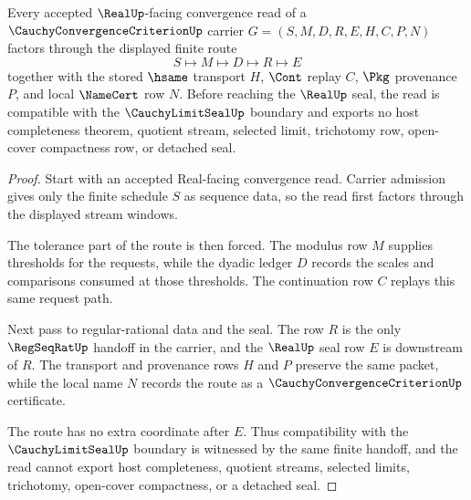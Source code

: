 \begin{theorem}
\label{thm:cauchy-convergence-criterion-real-seal-handoff}
Every accepted $\RealUp$-facing convergence read of a $\CauchyConvergenceCriterionUp$ carrier $G=(S,M,D,R,E,H,C,P,N)$ factors through the displayed finite route
$$
S \longmapsto M \longmapsto D \longmapsto R \longmapsto E
$$
together with the stored $\hsame$ transport $H$, $\Cont$ replay $C$, $\Pkg$ provenance $P$, and local $\NameCert$ row $N$. Before reaching the $\RealUp$ seal, the read is compatible with the $\CauchyLimitSealUp$ boundary and exports no host completeness theorem, quotient stream, selected limit, trichotomy row, open-cover compactness row, or detached seal.
\end{theorem}
\begin{proof}
Start with an accepted Real-facing convergence read. Carrier admission gives only the finite schedule $S$ as sequence data, so the read first factors through the displayed stream windows.

The tolerance part of the route is then forced. The modulus row $M$ supplies thresholds for the requests, while the dyadic ledger $D$ records the scales and comparisons consumed at those thresholds. The continuation row $C$ replays this same request path.

Next pass to regular-rational data and the seal. The row $R$ is the only $\RegSeqRatUp$ handoff in the carrier, and the $\RealUp$ seal row $E$ is downstream of $R$. The transport and provenance rows $H$ and $P$ preserve the same packet, while the local name $N$ records the route as a $\CauchyConvergenceCriterionUp$ certificate.

The route has no extra coordinate after $E$. Thus compatibility with the $\CauchyLimitSealUp$ boundary is witnessed by the same finite handoff, and the read cannot export host completeness, quotient streams, selected limits, trichotomy, open-cover compactness, or a detached seal.
\end{proof}

